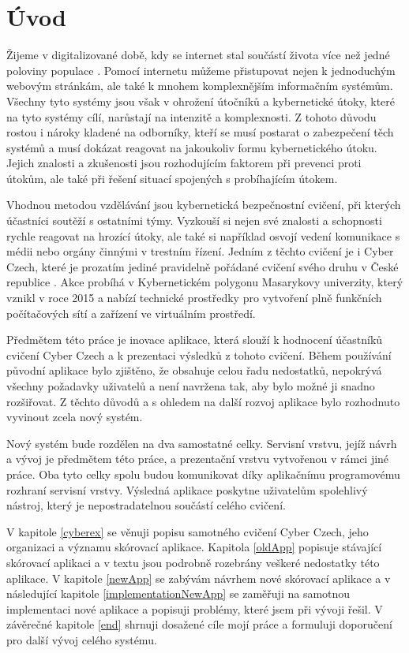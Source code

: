 \documentclass[
  digital,
  twoside,
  table, 
  nolof, 
  nolot
]{fithesis3}
\begin{document}
\chapter*{Úvod}

Žijeme v digitalizované době, kdy se internet stal součástí života více než jedné poloviny populace \cite{worldStats}. Pomocí internetu můžeme přistupovat nejen k jednoduchým webovým stránkám, ale také k mnohem komplexnějším informačním systémům. Všechny tyto systémy jsou však v ohrožení útočníků a kybernetické útoky, které na tyto systémy cílí, narůstají na intenzitě a komplexnosti. Z tohoto důvodu rostou i nároky kladené na odborníky, kteří se musí postarat o zabezpečení těch systémů a musí dokázat reagovat na jakoukoliv formu kybernetického útoku. Jejich znalosti a zkušenosti jsou rozhodujícím faktorem při prevenci proti útokům, ale také při řešení situací spojených s probíhajícím útokem.

Vhodnou metodou vzdělávání jsou kybernetická bezpečnostní cvičení, při kterých účastníci soutěží s ostatními týmy. Vyzkouší si nejen své znalosti a schopnosti rychle reagovat na hrozící útoky, ale také si například osvojí vedení komunikace s médii nebo orgány činnými v trestním řízení. Jedním z těchto cvičení je i Cyber Czech, které je prozatím jediné pravidelně pořádané cvičení svého druhu v České republice \cite{cyberex}. Akce probíhá v Kybernetickém polygonu Masarykovy univerzity, který vznikl v roce 2015 a nabízí technické prostředky pro vytvoření plně funkčních počítačových sítí a zařízení ve virtuálním prostředí.

Předmětem této práce je inovace aplikace, která slouží k hodnocení účastníků cvičení Cyber Czech a k prezentaci výsledků z tohoto cvičení. Během používání původní aplikace bylo zjištěno, že obsahuje celou řadu nedostatků, nepokrývá všechny požadavky uživatelů a není navržena tak, aby bylo možné ji snadno rozšiřovat. Z těchto důvodů a s ohledem na další rozvoj aplikace bylo rozhodnuto vyvinout zcela nový systém. 

Nový systém bude rozdělen na dva samostatné celky. Servisní vrstvu, jejíž návrh a vývoj je předmětem této práce, a prezentační vrstvu vytvořenou v rámci jiné práce. Oba tyto celky spolu budou komunikovat díky aplikačnímu programovému rozhraní servisní vrstvy. Výsledná aplikace poskytne uživatelům spolehlivý nástroj, který je nepostradatelnou součástí celého cvičení. 

V kapitole \ref{cyberex} se věnuji popisu samotného cvičení Cyber Czech, jeho organizaci a významu skórovací aplikace. Kapitola \ref{oldApp} popisuje stávající skórovací aplikaci a v textu jsou podrobně rozebrány veškeré nedostatky této aplikace. V kapitole \ref{newApp} se zabývám návrhem nové skórovací aplikace a v následující kapitole \ref{implementationNewApp} se zaměřuji na samotnou implementaci nové aplikace a popisuji problémy, které jsem při vývoji řešil. V závěrečné kapitole \ref{end} shrnuji dosažené cíle mojí práce a formuluji doporučení pro další vývoj celého systému.
\end{document}
